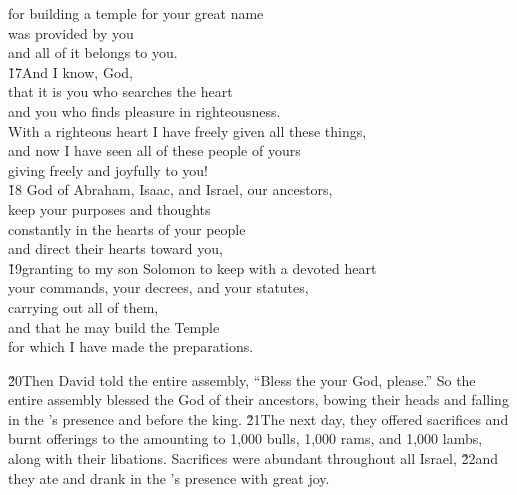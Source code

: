 \begin{poetry}
\poemll    for building a temple for your great name \\
\poeml was provided by you \\
\poemll    and all of it belongs to you. \\
\poeml \v{17}And I know, God, \\
\poemll    that it is you who searches the heart \\
\poemlll       and you who finds pleasure in righteousness. \\
\poeml With a righteous heart I have freely given all these things, \\
\poemll    and now I have seen all of these people of yours \\
\poemlll       giving freely and joyfully to you! \\
\poeml \v{18} God of Abraham, Isaac, and Israel, our ancestors, \\
\poemll    keep your purposes and thoughts \\
\poemlll       constantly in the hearts of your people \\
\poeml and direct their hearts toward you, \\
\poeml \v{19}granting to my son Solomon to keep with a devoted heart \\
\poeml your commands, your decrees, and your statutes, \\
\poemll    carrying out all of them, \\
\poeml and that he may build the Temple \\
\poemll    for which I have made the preparations.
\end{poetry}

\v{20}Then David told the entire assembly, ``Bless the  your God, please.'' So the entire assembly blessed the  God of their ancestors, bowing their heads and falling in the 's presence and before the king. \v{21}The next day, they offered sacrifices and burnt offerings to the  amounting to 1,000 bulls, 1,000 rams, and 1,000 lambs, along with their libations. Sacrifices were abundant throughout all Israel, \v{22}and they ate and drank in the 's presence with great joy.

